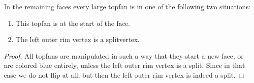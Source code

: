 \begin{lemma}
  \label{lm:topfan:remainingTopfans}
  In the remaining faces every large topfan is in one of the following two situations:
  \begin{enumerate}
    \item  This topfan is at the start of the face.
    \item  The left outer rim vertex is a splitvertex.
  \end{enumerate}
\end{lemma}
\begin{proof}
  All topfans are manipulated in such a way that they start a new face, or are colored blue entirely, unless the left outer rim vertex is a split. Since in that case we do not flip at all, but then the left outer rim vertex is indeed a split.
\end{proof}
